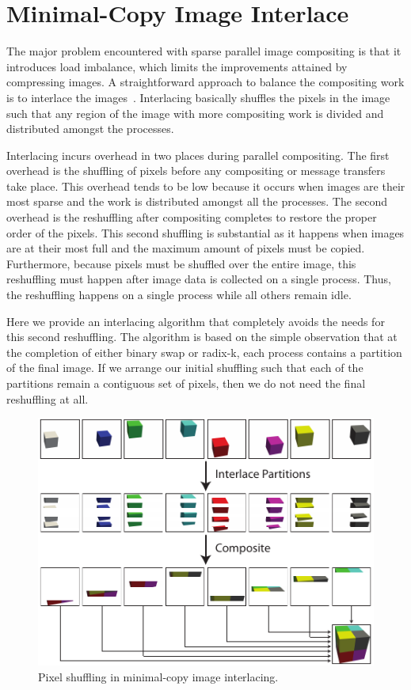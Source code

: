 \documentclass{sig-alternate}
\newcommand*{\lcite}[1]{~\cite{#1}}
\begin{document}
\section{Minimal-Copy Image Interlace}
\label{sec:ImageInterlacing}

The major problem encountered with sparse parallel image compositing is
that it introduces load imbalance, which limits the improvements attained
by compressing images.  A straightforward approach to balance the
compositing work is to interlace the
images\lcite{Molnar1994,Takeuchi2003}.  Interlacing basically shuffles the
pixels in the image such that any region of the image with more compositing
work is divided and distributed amongst the processes.

Interlacing incurs overhead in two places during parallel compositing.  The
first overhead is the shuffling of pixels before any compositing or message
transfers take place.  This overhead tends to be low because it occurs when
images are their most sparse and the work is distributed amongst all the
processes.  The second overhead is the reshuffling after compositing
completes to restore the proper order of the pixels.  This second shuffling
is substantial as it happens when images are at their most full and the
maximum amount of pixels must be copied.  Furthermore, because pixels must
be shuffled over the entire image, this reshuffling must happen after image
data is collected on a single process.  Thus, the reshuffling happens on a
single process while all others remain idle.

Here we provide an interlacing algorithm that completely avoids the needs
for this second reshuffling.  The algorithm is based on the simple
observation that at the completion of either binary swap or radix-k, each
process contains a partition of the final image.  If we arrange our initial
shuffling such that each of the partitions remain a contiguous set of
pixels, then we do not need the final reshuffling at all.

\begin{figure}[htbp]
  \centering
  \includegraphics[scale=.9]{images/InterlaceDiagram}
  \caption{Pixel shuffling in minimal-copy image interlacing.}
  \label{fig:Interlacing}
\end{figure}
\end{document}
